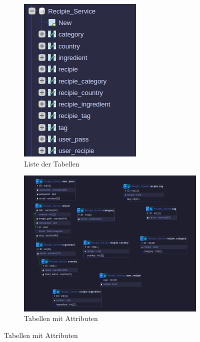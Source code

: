 \documentclass{report}
\begin{document}
\begin{figure}
    \begin{subfigure}{.5\textwidth}
        \centering
        \includegraphics[width=.8\linewidth]{Pictures/DB_Tables.png}
        \caption{Liste der Tabellen}
        \label{fig:sfig1}
    \end{subfigure}%
    \begin{subfigure}{.5\textwidth}
        \centering
        \includegraphics[width=.8\linewidth]{Pictures/DB_Tables2.png}
        \caption{Tabellen mit Attributen}
        \label{fig:sfig2} 
    \end{subfigure}
\end{figure}
\end{document}
